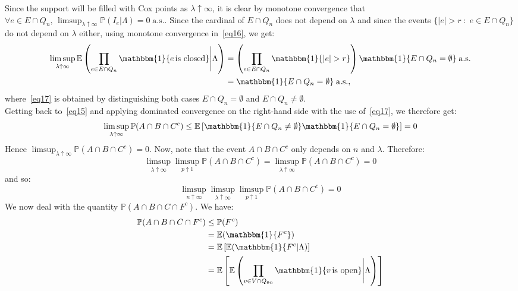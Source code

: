 \documentclass[10pt,a4paper]{amsart}
\theoremstyle{exampstyle}
\theoremstyle{exampnotations}
\begin{document}
Since the support will be filled with Cox points as $\lambda \uparrow \infty$, it is clear by monotone convergence that $\displaystyle \forall e \in E \cap Q_n, \, \limsup_{\lambda \uparrow \infty} \mathbb{P}(I_e \vert \Lambda) = 0 \; \text{a.s.}$. Since the cardinal of $E \cap Q_n$ does not depend on $\lambda$ and since the events $\lbrace \vert e \vert > r \; : \; e \in E \cap Q_n \rbrace$ do not depend on $\lambda$ either, using monotone convergence in~\eqref{eq16}, we get:
\begin{align}
   \nonumber  \limsup_{\lambda \uparrow \infty} \mathbb{E}\left( \prod_{e \in E \cap Q_n} \mathbbm{1} \lbrace e \, \text{is closed} \rbrace \Bigg\vert \Lambda \right) &= \left(\prod_{e \in E \cap Q_n} \mathbbm{1} \lbrace \vert e \vert > r \rbrace \right) \mathbbm{1}\lbrace E \cap Q_n = \emptyset \rbrace \; \text{a.s.}
   \\ \label{eq17} &= \mathbbm{1} \lbrace E \cap Q_n = \emptyset \rbrace \; \text{a.s.},
\end{align}
where~\eqref{eq17} is obtained by distinguishing both cases $E \cap Q_n = \emptyset$ and $E \cap Q_n \neq \emptyset$. \\
Getting back to~\eqref{eq15} and applying dominated convergence on the right-hand side with the use of~\eqref{eq17}, we therefore get:
\begin{equation*}
  \limsup_{\lambda \uparrow \infty} \mathbb{P}(A \cap B \cap C^c) \leq \mathbb{E}\left[\mathbbm{1}\lbrace E \cap Q_n \neq \emptyset \rbrace \mathbbm{1} \lbrace E \cap Q_n = \emptyset \rbrace \right] = 0  
\end{equation*}
Hence $\limsup_{\lambda \uparrow \infty} \mathbb{P}(A \cap B \cap C^c) = 0$. Now, note that the event $A \cap B \cap C^c$ only depends on $n$ and $\lambda$. Therefore:
\begin{equation*}
   \limsup_{\lambda \uparrow \infty}\limsup_{p \uparrow 1} \mathbb{P}(A \cap B \cap C^c) = \limsup_{\lambda \uparrow \infty} \mathbb{P}(A \cap B \cap C^c) = 0
\end{equation*}
and so:
\begin{equation}
    \label{eq18}
    \limsup_{n \uparrow \infty}\limsup_{\lambda \uparrow \infty}\limsup_{p \uparrow 1} \mathbb{P}(A \cap B \cap C^c) = 0
\end{equation}
We now deal with the quantity $\mathbb{P}(A \cap B \cap C \cap F^c)$. We have:
\begin{align*}
    \mathbb{P}(A \cap B \cap C \cap F^c) &\leq \mathbb{P}(F^{c})
    \\ &= \mathbb{E}(\mathbbm{1}\lbrace F^c \rbrace)
    \\ &= \mathbb{E}\left[\mathbb{E}(\mathbbm{1}\lbrace F^c \vert \Lambda ) \right]
    \\ &= \mathbb{E}\left[\mathbb{E}\left( \prod_{v \in V \cap Q_{6n}} \mathbbm{1}\lbrace v \, \text{is open} \rbrace \Bigg\vert \Lambda \right)\right]
\end{align*}
\end{document}
